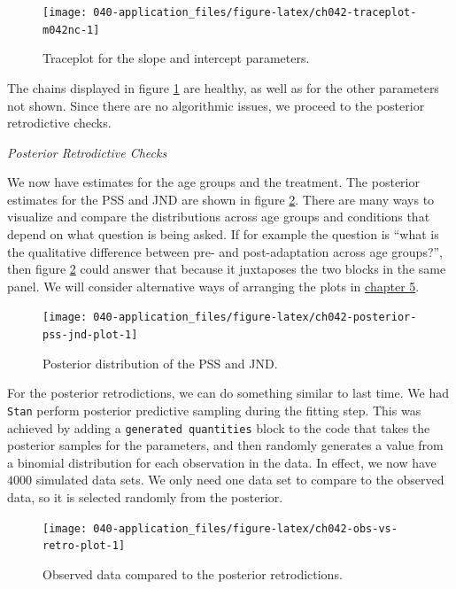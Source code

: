 \documentclass[11pt, oneside, openany]{scrbook}
\begin{document}
\begin{figure}

{\centering \texttt{[image: 040-application\_files/figure-latex/ch042-traceplot-m042nc-1]} 

}

\caption{Traceplot for the slope and intercept parameters.}\label{fig:ch042-traceplot-m042nc}
\end{figure}

The chains displayed in figure \ref{fig:ch042-traceplot-m042nc} are healthy, as well as for the other parameters not shown. Since there are no algorithmic issues, we proceed to the posterior retrodictive checks.

\emph{Posterior Retrodictive Checks}

We now have estimates for the age groups and the treatment. The posterior estimates for the PSS and JND are shown in figure \ref{fig:ch042-posterior-pss-jnd-plot}. There are many ways to visualize and compare the distributions across age groups and conditions that depend on what question is being asked. If for example the question is ``what is the qualitative difference between pre- and post-adaptation across age groups?'', then figure \ref{fig:ch042-posterior-pss-jnd-plot} could answer that because it juxtaposes the two blocks in the same panel. We will consider alternative ways of arranging the plots in \protect\hyperlink{results}{chapter 5}.

\begin{figure}

{\centering \texttt{[image: 040-application\_files/figure-latex/ch042-posterior-pss-jnd-plot-1]} 

}

\caption{Posterior distribution of the PSS and JND.}\label{fig:ch042-posterior-pss-jnd-plot}
\end{figure}

For the posterior retrodictions, we can do something similar to last time. We had \texttt{Stan} perform posterior predictive sampling during the fitting step. This was achieved by adding a \texttt{generated\ quantities} block to the code that takes the posterior samples for the parameters, and then randomly generates a value from a binomial distribution for each observation in the data. In effect, we now have \(4000\) simulated data sets. We only need one data set to compare to the observed data, so it is selected randomly from the posterior.

\begin{figure}

{\centering \texttt{[image: 040-application\_files/figure-latex/ch042-obs-vs-retro-plot-1]} 

}

\caption{Observed data compared to the posterior retrodictions.}\label{fig:ch042-obs-vs-retro-plot}
\end{figure}
\end{document}
